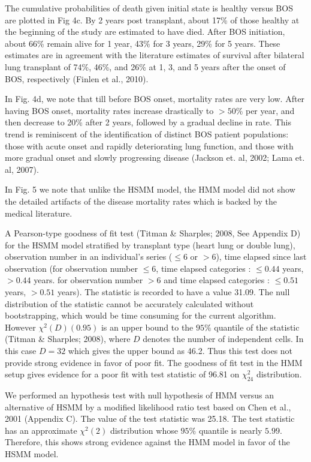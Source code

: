 \documentclass{uwstat572}
\begin{document}
The cumulative probabilities of death given initial state is healthy versus BOS are plotted in Fig 4c. By 2 years post transplant, about 17\% of those healthy at the beginning of the study are estimated to have died. After BOS initiation, about 66\% remain alive for 1 year, 43\% for 3 years, 29\% for 5 years. These estimates are in agreement with the literature estimates of survival after bilateral lung transplant of 74\%, 46\%, and 26\% at 1, 3, and 5 years after the onset of BOS, respectively (Finlen et al., 2010).

In Fig. 4d, we note that till before BOS onset, mortality rates are very low. After having BOS onset, mortality rates increase drastically to $>50\%$ per year, and then decrease to 20\% after 2 years, followed by a gradual decline in rate. This trend is reminiscent of the identification of distinct BOS patient populations: those with acute onset and rapidly deteriorating lung function, and those with more gradual onset and slowly progressing disease (Jackson et. al, 2002; Lama et. al, 2007).

In Fig. 5 we note that unlike the HSMM model, the HMM model did not show the detailed artifacts of the disease mortality rates which is backed by the medical literature.

A Pearson-type goodness of fit test (Titman \& Sharples; 2008, See Appendix D) for the HSMM model stratified by transplant type (heart lung or double lung), observation number in an individual’s series ($\leq 6$ or $>6$), time elapsed since last observation (for observation number $\leq 6$, time elapsed categories : $\leq 0.44$ years, $> 0.44$ years. for observation number $> 6$ and time elapsed categories : $\leq 0.51$ years, $> 0.51$ years). The statistic is recorded to have a value 31.09. The null distribution of the statistic cannot be accurately calculated without bootstrapping, which would be time consuming for the current algorithm. However $\chi^2(D) (0.95)$ is an upper bound to the $95\%$ quantile of the statistic (Titman \& Sharples; 2008), where $D$ denotes the number of independent cells. In this case $D = 32$ which gives the upper bound as 46.2. Thus this test does not provide strong evidence in favor of poor fit. The goodness of fit test in the HMM setup gives evidence for a poor fit with test statistic of 96.81 on $\chi^2_{24}$ distribution.

We performed an hypothesis test with null hypothesis of HMM versus an alternative of HSMM by a modified likelihood ratio test based on Chen et al., 2001 (Appendix C). The value of the test statistic was 25.18. The test statistic has an approximate $\chi^2(2)$ distribution whose $95\%$ quantile is nearly $5.99$. Therefore, this shows strong evidence against the HMM model in favor of the HSMM model.
\end{document}
